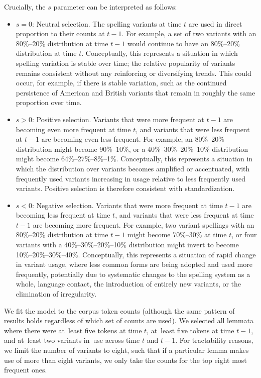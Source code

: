 \documentclass[doc,biblatex]{apa7}
\begin{document}
Crucially, the $s$ parameter can be interpreted as follows:
\begin{itemize}
	\item $s = 0$: Neutral selection. The spelling variants at time $t$ are used in direct proportion to their counts at $t-1$. For example, a set of two variants with an 80\%--20\% distribution at time $t-1$ would continue to have an 80\%--20\% distribution at time $t$. Conceptually, this represents a situation in which spelling variation is stable over time; the relative popularity of variants remains consistent without any reinforcing or diversifying trends. This could occur, for example, if there is stable variation, such as the continued persistence of American and British variants that remain in roughly the same proportion over time.
	\item $s > 0$: Positive selection. Variants that were more frequent at $t-1$ are becoming even more frequent at time $t$, and variants that were less frequent at $t-1$ are becoming even less frequent. For example, an 80\%--20\% distribution might become 90\%--10\%, or a 40\%--30\%--20\%--10\% distribution might become 64\%--27\%--8\%--1\%. Conceptually, this represents a situation in which the distribution over variants becomes amplified or accentuated, with frequently used variants increasing in usage relative to less frequently used variants. Positive selection is therefore consistent with standardization.
	\item $s < 0$: Negative selection. Variants that were more frequent at time $t-1$ are becoming less frequent at time $t$, and variants that were less frequent at time $t-1$ are becoming more frequent. For example, two variant spellings with an 80\%--20\% distribution at time $t-1$ might become 70\%--30\% at time $t$, or four variants with a 40\%--30\%--20\%--10\% distribution might invert to become 10\%--20\%--30\%--40\%. Conceptually, this represents a situation of rapid change in variant usage, where less common forms are being adopted and used more frequently, potentially due to systematic changes to the spelling system as a whole, language contact, the introduction of entirely new variants, or the elimination of irregularity.
\end{itemize}

We fit the model to the corpus token counts (although the same pattern of results holds regardless of which set of counts are used). We selected all lemmata where there were at~least five tokens at time $t$, at~least five tokens at time $t-1$, and at~least two variants in~use across time $t$ and $t-1$. For tractability reasons, we limit the number of variants to eight, such that if a particular lemma makes use of more than eight variants, we only take the counts for the top eight most frequent ones.
\end{document}
